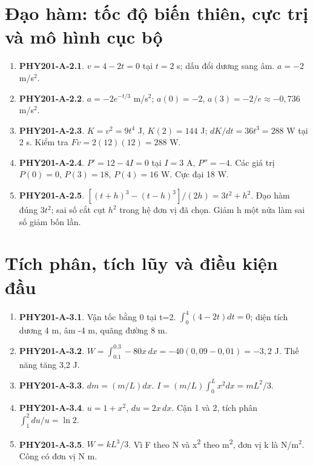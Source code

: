 \documentclass[11pt,a4paper,openany]{book}
\begin{document}
\section{Đạo hàm: tốc độ biến thiên, cực trị và mô hình cục bộ}
\begin{enumerate}
\item \textbf{PHY201-A-2.1}. $v=4-2t=0$ tại $t=2$ s; dấu đổi dương sang âm. $a=-2$ m/s$^2$.
\item \textbf{PHY201-A-2.2}. $a=-2e^{-t/3}$ m/s$^2$; $a(0)=-2$, $a(3)=-2/e\approx-0{,}736$ m/s$^2$.
\item \textbf{PHY201-A-2.3}. $K=v^2=9t^4$ J, $K(2)=144$ J; $dK/dt=36t^3=288$ W tại 2 s. Kiểm tra $Fv=2(12)(12)=288$ W.
\item \textbf{PHY201-A-2.4}. $P'=12-4I=0$ tại $I=3$ A, $P''=-4$. Các giá trị $P(0)=0$, $P(3)=18$, $P(4)=16$ W. Cực đại 18 W.
\item \textbf{PHY201-A-2.5}. $[(t+h)^3-(t-h)^3]/(2h)=3t^2+h^2$. Đạo hàm đúng $3t^2$; sai số cắt cụt $h^2$ trong hệ đơn vị đã chọn. Giảm h một nửa làm sai số giảm bốn lần.
\end{enumerate}
\section{Tích phân, tích lũy và điều kiện đầu}
\begin{enumerate}
\item \textbf{PHY201-A-3.1}. Vận tốc bằng 0 tại t=2. $\int_0^4(4-2t)dt=0$; diện tích dương 4 m, âm -4 m, quãng đường 8 m.
\item \textbf{PHY201-A-3.2}. $W=\int_{0.1}^{0.3}-80x\,dx=-40(0{,}09-0{,}01)=-3{,}2$ J. Thế năng tăng 3,2 J.
\item \textbf{PHY201-A-3.3}. $dm=(m/L)dx$. $I=(m/L)\int_0^L x^2dx=mL^2/3$.
\item \textbf{PHY201-A-3.4}. $u=1+x^2$, $du=2x\,dx$. Cận 1 và 2, tích phân $\int_1^2du/u=\ln2$.
\item \textbf{PHY201-A-3.5}. $W=kL^3/3$. Vì F theo N và x\textsuperscript{2} theo m\textsuperscript{2}, đơn vị k là N/m$^2$. Công có đơn vị N m.
\end{enumerate}
\end{document}
